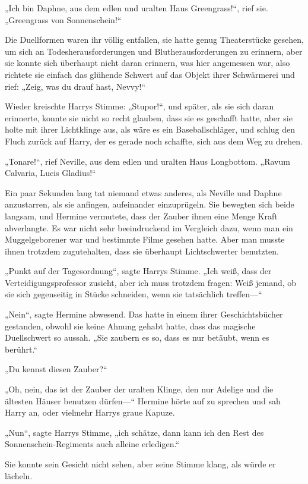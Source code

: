{„Ich bin Daphne, aus dem edlen und uralten Haus Greengrass!“, rief sie. „Greengrass von Sonnenschein!“

Die Duellformen waren ihr völlig entfallen, sie hatte genug Theaterstücke gesehen, um sich an Todesherausforderungen und Blutherausforderungen zu erinnern, aber sie konnte sich überhaupt nicht daran erinnern, was hier angemessen war, also richtete sie einfach das glühende Schwert auf das Objekt ihrer Schwärmerei und rief: „Zeig, was du drauf hast, Nevvy!“

Wieder kreischte Harrys Stimme: „Stupor!“, und später, als sie sich daran erinnerte, konnte sie nicht so recht glauben, dass sie es geschafft hatte, aber sie holte mit ihrer Lichtklinge aus, als wäre es ein Baseballschläger, und schlug den Fluch zurück auf Harry, der es gerade noch schaffte, sich aus dem Weg zu drehen.

„Tonare!“, rief Neville, aus dem edlen und uralten Haus Longbottom. „Ravum Calvaria, Lucis Gladius!“

Ein paar Sekunden lang tat niemand etwas anderes, als Neville und Daphne anzustarren, als sie anfingen, aufeinander einzuprügeln. Sie bewegten sich beide langsam, und Hermine vermutete, dass der Zauber ihnen eine Menge Kraft abverlangte. Es war nicht sehr beeindruckend im Vergleich dazu, wenn man ein Muggelgeborener war und bestimmte Filme gesehen hatte. Aber man musste ihnen trotzdem zugutehalten, dass sie überhaupt Lichtschwerter benutzten.

„Punkt auf der Tagesordnung“, sagte Harrys Stimme. „Ich weiß, dass der Verteidigungsprofessor zusieht, aber ich muss trotzdem fragen: Weiß jemand, ob sie sich gegenseitig in Stücke schneiden, wenn sie tatsächlich treffen—“

„Nein“, sagte Hermine abwesend. Das hatte in einem ihrer Geschichtsbücher gestanden, obwohl sie keine Ahnung gehabt hatte, dass das magische Duellschwert so aussah. „Sie zaubern es so, dass es nur betäubt, wenn es berührt.“

„Du kennst diesen Zauber?“

„Oh, nein, das ist der Zauber der uralten Klinge, den nur Adelige und die ältesten Häuser benutzen dürfen—“ Hermine hörte auf zu sprechen und sah Harry an, oder vielmehr Harrys graue Kapuze.

„Nun“, sagte Harrys Stimme, „ich schätze, dann kann ich den Rest des Sonnenschein-Regiments auch alleine erledigen.“

Sie konnte sein Gesicht nicht sehen, aber seine Stimme klang, als würde er lächeln.

}
